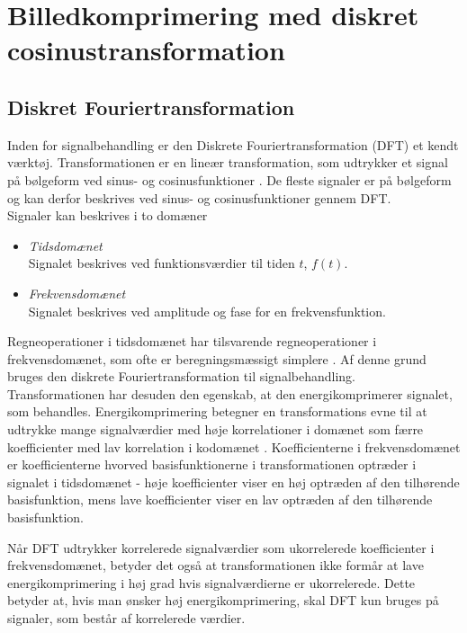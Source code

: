 \chapter{Billedkomprimering med diskret cosinustransformation} \label{chapter:DCT}

\section{Diskret Fouriertransformation}
Inden for signalbehandling er den Diskrete Fouriertransformation (DFT) et kendt værktøj. Transformationen er en lineær transformation, som udtrykker et signal på bølgeform ved sinus- og cosinusfunktioner \citep{thefouriertransform}. De fleste signaler er på bølgeform og kan derfor beskrives ved sinus- og cosinusfunktioner gennem DFT.\\
Signaler kan beskrives i to domæner
\begin{itemize}
\item \textit{Tidsdomænet}\\
		Signalet beskrives ved funktionsværdier til tiden $t$, $f(t)$.
\item \textit{Frekvensdomænet}\\
		Signalet beskrives ved amplitude og fase for en frekvensfunktion.
\end{itemize}
Regneoperationer i tidsdomænet har tilsvarende regneoperationer i frekvensdomænet, som ofte er beregningsmæssigt simplere \citep{nbtwiki}. Af denne grund bruges den diskrete Fouriertransformation til signalbehandling.\\
Transformationen har desuden den egenskab, at den energikomprimerer signalet, som behandles. Energikomprimering betegner en transformations evne til at udtrykke mange signalværdier med høje korrelationer i domænet som færre koefficienter med lav korrelation i kodomænet \citep{smcnus_energy}. Koefficienterne i frekvensdomænet er koefficienterne hvorved basisfunktionerne i transformationen optræder i signalet i tidsdomænet  - høje koefficienter viser en høj optræden af den tilhørende basisfunktion, mens lave koefficienter viser en lav optræden af den tilhørende basisfunktion.

Når DFT udtrykker korrelerede signalværdier som ukorrelerede koefficienter i frekvensdomænet, betyder det også at transformationen ikke formår at lave energikomprimering i høj grad hvis signalværdierne er ukorrelerede. Dette betyder at, hvis man ønsker høj energikomprimering, skal DFT kun bruges på signaler, som består af korrelerede værdier.

